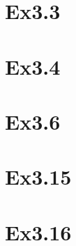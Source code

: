 \documentclass{article}
\begin{document}
\section{Ex3.3}

\section{Ex3.4}

\section{Ex3.6}

\section{Ex3.15}

\section{Ex3.16}
\end{document}
